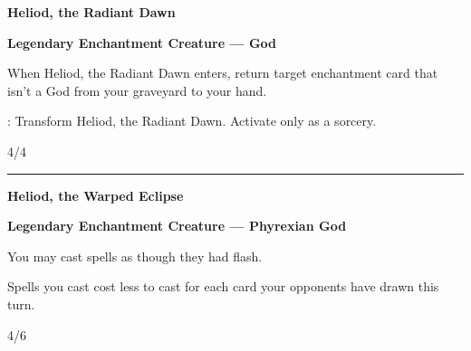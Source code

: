 \documentclass[8pt]{extarticle}
\begin{document}
{\large\textbf{Heliod, the Radiant Dawn}}
\hfill
\2\W\W

\textbf{Legendary Enchantment Creature — God}

When Heliod, the Radiant Dawn enters, return target enchantment card that isn't a God from your graveyard to your hand.

\3\UP: Transform Heliod, the Radiant Dawn. Activate only as a sorcery.

\hfill4/4

\vfill
\hrule
\vfill

{\large\textbf{Heliod, the Warped Eclipse}}

\textbf{Legendary Enchantment Creature — Phyrexian God}

You may cast spells as though they had flash.

Spells you cast cost \1 less to cast for each card your opponents have drawn this turn.

\hfill4/6
\end{document}
